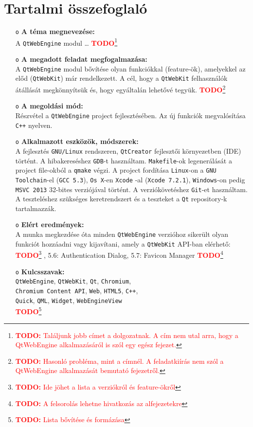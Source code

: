 \documentclass[12pt]{report}
\newcommand{\todo}[1]{%
    \textcolor{red}{\textbf{TODO}}\footnote{\textcolor{red}{\textbf{TODO:} #1}}
}
\begin{document}
\chapter*{Tartalmi összefoglaló}
\begin{itemize}
    \item[\texttt{o}] \textbf{A téma megnevezése:} \\
        A \texttt{QtWebEngine} modul \dots
        \todo{Találjunk jobb címet a dolgozatnak. A cím nem utal arra, hogy a QtWebEngine
        alkalmazásáról is szól egy egész fejezet.}
    \item[\texttt{o}] \textbf{A megadott feladat megfogalmazása:} \\
        A \texttt{QtWebEngine} modul bővítése olyan funkciókkal (feature-ök),
        amelyekkel az előd (\texttt{QtWebKit}) már rendelkezett. A cél, hogy a
        \texttt{QtWebKit} felhasználók átállását megkönnyítsük és, hogy egyáltalán
        lehetővé tegyük.
        \todo{Hasonló probléma, mint a címnél. A feladatkiírás nem szól a QtWebEngine
        alkalmazását bemutató fejezetről.}
    \item[\texttt{o}] \textbf{A megoldási mód:} \\
        Részvétel a \texttt{QtWebEngine} project fejlesztésében. Az új funkciók
        megvalósítása \texttt{C++} nyelven.
    \item[\texttt{o}] \textbf{Alkalmazott eszközök, módszerek:} \\
        A fejlesztés \texttt{GNU/Linux} rendszeren, \texttt{QtCreator} fejlesztői
        környezetben (IDE) történt. A hibakereséshez \texttt{GDB}-t használtam.
        \texttt{Makefile}-ok legenerálását a project file-okból a \texttt{qmake} végzi.
        A project fordítása \texttt{Linux}-on a \texttt{GNU Toolchain}-el (\texttt{GCC 5.3}),
        \texttt{Os X}-en \texttt{Xcode} -al (\texttt{Xcode 7.2.1}), \texttt{Windows}-on pedig
        \texttt{MSVC 2013} 32-bites verziójával történt. A verziókövetéshez \texttt{Git}-et
        használtam. A teszteléshez szükséges keretrendszert és a teszteket a \texttt{Qt}
        repository-k tartalmazzák.
    \item[\texttt{o}] \textbf{Elért eredmények:} \\
        A munka megkezdése óta minden \texttt{QtWebEngine} verzióhoz sikerült olyan funkciót
        hozzáadni vagy kijavítani, amely a \texttt{QtWebKit} API-ban elérhető:
        \todo{Ide jöhet a lista a verziókról és feature-ökről}, 5.6: Authentication Dialog,
        5.7: Favicon Manager \todo{A felsorolás lehetne hivatkozás az alfejezetekre}
    \item[\texttt{o}] \textbf{Kulcsszavak:} \\
        \texttt{QtWebEngine}, \texttt{QtWebKit}, \texttt{Qt}, \texttt{Chromium}, \\
        \texttt{Chromium Content API}, \texttt{Web}, \texttt{HTML5}, \texttt{C++}, \\
        \texttt{Quick}, \texttt{QML}, \texttt{Widget}, \texttt{WebEngineView} \\
        \todo{Lista bővítése és formázása}
\end{itemize}
\end{document}
